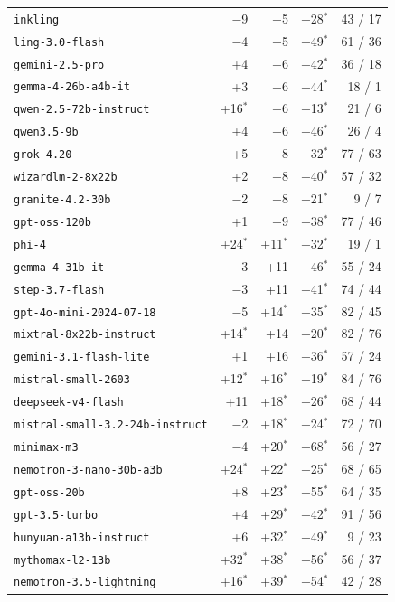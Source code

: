 {\begin{tabular}[t]{lrrrr}
\texttt{inkling} & $-$9 & +5 & +28$^*$ & 43 / 17 \\
\texttt{ling-3.0-flash} & $-$4 & +5 & +49$^*$ & 61 / 36 \\
\texttt{gemini-2.5-pro} & +4 & +6 & +42$^*$ & 36 / 18 \\
\texttt{gemma-4-26b-a4b-it} & +3 & +6 & +44$^*$ & 18 / 1 \\
\texttt{qwen-2.5-72b-instruct} & +16$^*$ & +6 & +13$^*$ & 21 / 6 \\
\texttt{qwen3.5-9b} & +4 & +6 & +46$^*$ & 26 / 4 \\
\texttt{grok-4.20} & +5 & +8 & +32$^*$ & 77 / 63 \\
\texttt{wizardlm-2-8x22b} & +2 & +8 & +40$^*$ & 57 / 32 \\
\texttt{granite-4.2-30b} & $-$2 & +8 & +21$^*$ & 9 / 7 \\
\texttt{gpt-oss-120b} & +1 & +9 & +38$^*$ & 77 / 46 \\
\texttt{phi-4} & +24$^*$ & +11$^*$ & +32$^*$ & 19 / 1 \\
\texttt{gemma-4-31b-it} & $-$3 & +11 & +46$^*$ & 55 / 24 \\
\texttt{step-3.7-flash} & $-$3 & +11 & +41$^*$ & 74 / 44 \\
\texttt{gpt-4o-mini-2024-07-18} & $-$5 & +14$^*$ & +35$^*$ & 82 / 45 \\
\texttt{mixtral-8x22b-instruct} & +14$^*$ & +14 & +20$^*$ & 82 / 76 \\
\texttt{gemini-3.1-flash-lite} & +1 & +16 & +36$^*$ & 57 / 24 \\
\texttt{mistral-small-2603} & +12$^*$ & +16$^*$ & +19$^*$ & 84 / 76 \\
\texttt{deepseek-v4-flash} & +11 & +18$^*$ & +26$^*$ & 68 / 44 \\
\texttt{mistral-small-3.2-24b-instruct} & $-$2 & +18$^*$ & +24$^*$ & 72 / 70 \\
\texttt{minimax-m3} & $-$4 & +20$^*$ & +68$^*$ & 56 / 27 \\
\texttt{nemotron-3-nano-30b-a3b} & +24$^*$ & +22$^*$ & +25$^*$ & 68 / 65 \\
\texttt{gpt-oss-20b} & +8 & +23$^*$ & +55$^*$ & 64 / 35 \\
\texttt{gpt-3.5-turbo} & +4 & +29$^*$ & +42$^*$ & 91 / 56 \\
\texttt{hunyuan-a13b-instruct} & +6 & +32$^*$ & +49$^*$ & 9 / 23 \\
\texttt{mythomax-l2-13b} & +32$^*$ & +38$^*$ & +56$^*$ & 56 / 37 \\
\texttt{nemotron-3.5-lightning} & +16$^*$ & +39$^*$ & +54$^*$ & 42 / 28 \\
\bottomrule
\end{tabular}}
